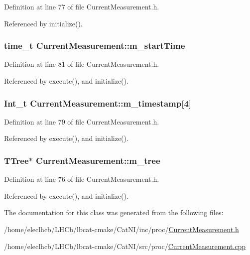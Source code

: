 Definition at line 77 of file CurrentMeasurement.h.

Referenced by initialize().\hypertarget{classCurrentMeasurement_abd5a7612f08721143623add96797a433}{
\subsubsection[{m\_\-startTime}]{\setlength{\rightskip}{0pt plus 5cm}time\_\-t {\bf CurrentMeasurement::m\_\-startTime}}}
\label{classCurrentMeasurement_abd5a7612f08721143623add96797a433}


Definition at line 81 of file CurrentMeasurement.h.

Referenced by execute(), and initialize().\hypertarget{classCurrentMeasurement_acc9f2cabf165e47a9fbf2a357e424cef}{
\subsubsection[{m\_\-timestamp}]{\setlength{\rightskip}{0pt plus 5cm}Int\_\-t {\bf CurrentMeasurement::m\_\-timestamp}\mbox{[}4\mbox{]}}}
\label{classCurrentMeasurement_acc9f2cabf165e47a9fbf2a357e424cef}


Definition at line 79 of file CurrentMeasurement.h.

Referenced by execute(), and initialize().\hypertarget{classCurrentMeasurement_a559823413932b393dedfc62d42268d93}{
\subsubsection[{m\_\-tree}]{\setlength{\rightskip}{0pt plus 5cm}TTree$\ast$ {\bf CurrentMeasurement::m\_\-tree}}}
\label{classCurrentMeasurement_a559823413932b393dedfc62d42268d93}


Definition at line 76 of file CurrentMeasurement.h.

Referenced by execute(), and initialize().

The documentation for this class was generated from the following files:\begin{DoxyCompactItemize}
\item 
/home/eleclhcb/LHCb/lbcat-\/cmake/CatNI/inc/proc/\hyperlink{CurrentMeasurement_8h}{CurrentMeasurement.h}\item 
/home/eleclhcb/LHCb/lbcat-\/cmake/CatNI/src/proc/\hyperlink{CurrentMeasurement_8cpp}{CurrentMeasurement.cpp}\end{DoxyCompactItemize}
